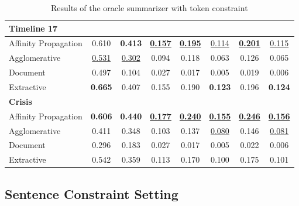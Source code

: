 \documentclass[a4paper,BCOR=10mm]{report}
\numberwithin{lemma}{chapter}
\numberwithin{definition}{chapter}
\begin{document}
\begin{table}
\begin{tabular}{|l|ccccccc|}
\hline
\multicolumn{ 8 }{|l|}{ \textbf{ Timeline 17 } }\\\hline
Affinity Propagation & 0.610&\textbf{ 0.413 }&\underline{\textbf{ 0.157 }}&\underline{\textbf{ 0.195 }}&\underline{0.114}&\underline{\textbf{ 0.201 }}&\underline{0.115}\\\hline
Agglomerative & \underline{0.531}&\underline{0.302}&0.094&0.118&0.063&0.126&0.065\\\hline
Document & 0.497&0.104&0.027&0.017&0.005&0.019&0.006\\\hline
Extractive & \textbf{ 0.665 }&0.407&0.155&0.190&\textbf{ 0.123 }&0.196&\textbf{ 0.124 }\\\hline
\hline\multicolumn{ 8 }{|l|}{ \textbf{ Crisis } }\\\hline
Affinity Propagation & \textbf{ 0.606 }&\textbf{ 0.440 }&\underline{\textbf{ 0.177 }}&\underline{\textbf{ 0.240 }}&\underline{\textbf{ 0.155 }}&\underline{\textbf{ 0.246 }}&\underline{\textbf{ 0.156 }}\\\hline
Agglomerative & 0.411&0.348&0.103&0.137&\underline{0.080}&0.146&\underline{0.081}\\\hline
Document & 0.296&0.183&0.027&0.017&0.005&0.022&0.006\\\hline
Extractive & 0.542&0.359&0.113&0.170&0.100&0.175&0.101\\\hline\end{tabular}

\caption{Results of the oracle summarizer with token constraint}
\label{tab:results-oracle-tok}

\end{table}




\subsection{Sentence Constraint Setting}
\end{document}
